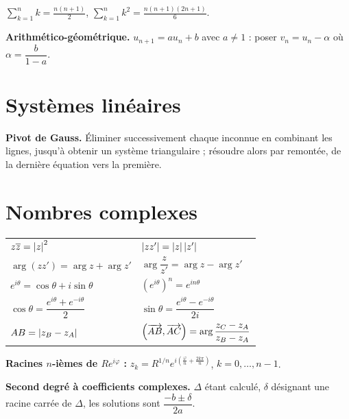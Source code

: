 \noindent
$\displaystyle\sum_{k=1}^{n}k = \frac{n(n+1)}{2}$, \quad
$\displaystyle\sum_{k=1}^{n}k^{2} = \frac{n(n+1)(2n+1)}{6}$.

\smallskip
\noindent
\textbf{Arithmético-géométrique.} $u_{n+1} = au_{n}+b$ avec $a \neq 1$ :
poser $v_{n} = u_{n}-\alpha$ où $\alpha = \dfrac{b}{1-a}$.

\section*{Systèmes linéaires}

\noindent
\textbf{Pivot de Gauss.} Éliminer successivement chaque inconnue en
combinant les lignes, jusqu'à obtenir un système triangulaire ; résoudre
alors par remontée, de la dernière équation vers la première.

\section*{Nombres complexes}

\begin{center}
\setlength{\tabcolsep}{10pt}
\renewcommand{\arraystretch}{1.55}
\begin{tabular}{@{}ll@{}}
\toprule
$z\overline z = \left|z\right|^{2}$ & $\left|zz'\right| = \left|z\right|\left|z'\right|$ \\
$\arg(zz') = \arg z+\arg z'$ & $\arg\dfrac{z}{z'} = \arg z-\arg z'$ \\
$e^{i\theta} = \cos\theta+i\sin\theta$ &
  $\left(e^{i\theta}\right)^{n} = e^{in\theta}$ \\
$\cos\theta = \dfrac{e^{i\theta}+e^{-i\theta}}{2}$ &
$\sin\theta = \dfrac{e^{i\theta}-e^{-i\theta}}{2i}$ \\
$AB = \left|z_{B}-z_{A}\right|$ &
$\left(\overrightarrow{AB},\overrightarrow{AC}\right)
 = \arg\dfrac{z_{C}-z_{A}}{z_{B}-z_{A}}$ \\
\bottomrule
\end{tabular}
\end{center}

\noindent
\textbf{Racines $n$-ièmes de $Re^{i\varphi}$ :}
$z_{k} = R^{1/n}e^{i\left(\frac{\varphi}{n}+\frac{2k\pi}{n}\right)}$,
$k = 0,\dots,n-1$.

\smallskip
\noindent
\textbf{Second degré à coefficients complexes.} $\Delta$ étant calculé,
$\delta$ désignant une racine carrée de $\Delta$, les solutions sont
$\dfrac{-b \pm \delta}{2a}$.

